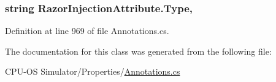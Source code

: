 \subsubsection[{Type}]{\setlength{\rightskip}{0pt plus 5cm}string Razor\+Injection\+Attribute.\+Type\hspace{0.3cm}{\ttfamily [get]}, {}}\label{class_razor_injection_attribute_a03ab3ec12db49f3eeca9d462b95bb6fd}


Definition at line 969 of file Annotations.\+cs.



The documentation for this class was generated from the following file\+:\begin{DoxyCompactItemize}
\item 
C\+P\+U-\/\+O\+S Simulator/\+Properties/\hyperlink{_annotations_8cs}{Annotations.\+cs}\end{DoxyCompactItemize}
